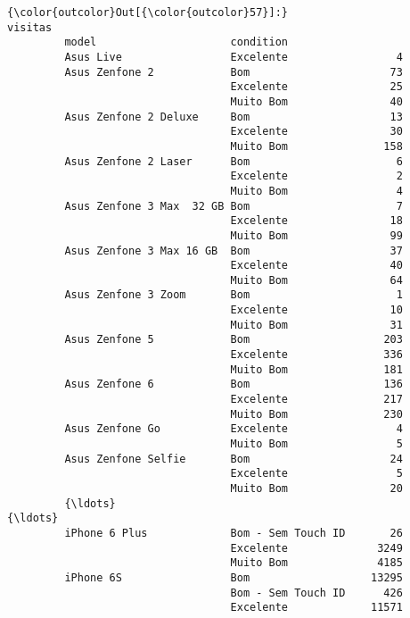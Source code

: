 \documentclass[11pt]{article}
\begin{document}
\begin{Verbatim}[commandchars=\\\{\}]
{\color{outcolor}Out[{\color{outcolor}57}]:}                                               visitas
         model                     condition                  
         Asus Live                 Excelente                 4
         Asus Zenfone 2            Bom                      73
                                   Excelente                25
                                   Muito Bom                40
         Asus Zenfone 2 Deluxe     Bom                      13
                                   Excelente                30
                                   Muito Bom               158
         Asus Zenfone 2 Laser      Bom                       6
                                   Excelente                 2
                                   Muito Bom                 4
         Asus Zenfone 3 Max  32 GB Bom                       7
                                   Excelente                18
                                   Muito Bom                99
         Asus Zenfone 3 Max 16 GB  Bom                      37
                                   Excelente                40
                                   Muito Bom                64
         Asus Zenfone 3 Zoom       Bom                       1
                                   Excelente                10
                                   Muito Bom                31
         Asus Zenfone 5            Bom                     203
                                   Excelente               336
                                   Muito Bom               181
         Asus Zenfone 6            Bom                     136
                                   Excelente               217
                                   Muito Bom               230
         Asus Zenfone Go           Excelente                 4
                                   Muito Bom                 5
         Asus Zenfone Selfie       Bom                      24
                                   Excelente                 5
                                   Muito Bom                20
         {\ldots}                                               {\ldots}
         iPhone 6 Plus             Bom - Sem Touch ID       26
                                   Excelente              3249
                                   Muito Bom              4185
         iPhone 6S                 Bom                   13295
                                   Bom - Sem Touch ID      426
                                   Excelente             11571

\end{Verbatim}
\end{document}
